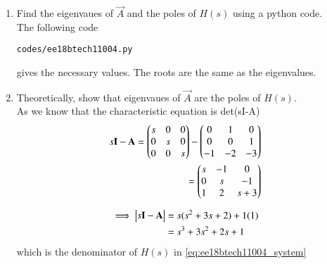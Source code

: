 \begin{enumerate}[label=\thesection.\arabic*.,ref=\thesection.\theenumi]
%

\item Find the eigenvaues of $\vec{A}$ and the poles of $H(s)$ using a python code.
\\
\solution The following code 
%
\begin{lstlisting}
codes/ee18btech11004.py
\end{lstlisting}
gives the necessary values.  The roots are the same as the eigenvalues.
%
\item Theoretically, show that eigenvaues of $\vec{A}$ are the poles of  $H(s)$.\\
\solution 
As we know that  the characteristic equation is det(sI-A) 
\\\begin{align}
s\mathbf{I}-\mathbf{A}=
\begin{pmatrix}s&0&0\\0&s&0\\0&0&s\end{pmatrix}
-
\begin{pmatrix}0&1&0\\0&0&1\\-1&-2&-3\end{pmatrix}\\
=\begin{pmatrix}s&-1&0\\0&s&-1\\1&2&s+3\end{pmatrix}
\end{align}

\begin{align}
\implies \begin{vmatrix}s\mathbf{I}-\mathbf{A}\end{vmatrix}&=s(s^2+3s+2)+1(1)\\
&=s^3+3s^2+2s+1
\end{align} 
which is the denominator of $H(s)$ in \eqref{eq:ee18btech11004_system}
%
\end{enumerate}

